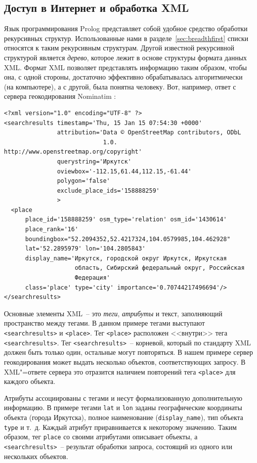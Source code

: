 \documentclass[a4paper,14pt, openany, twoside, final]{extbook} %
\begin{document}
\subsection{Доступ в Интернет и обработка XML}
\label{sec:inetxml}

Язык программирования Prolog представляет собой удобное средство обработки рекурсивных структур.  Использованные нами в разделе~\ref{sec:breadthfirst} списки относятся к таким рекурсивным структурам.  Другой известной рекурсивной структурой является \emph{дерево}, которое лежит в основе структуры формата данных XML.  Формат XML позволяет представлять информацию таким образом, чтобы она, с одной стороны, достаточно эффективно обрабатывалась алгоритмически (на компьютере), а с другой, была понятна человеку.  Вот, например, ответ с сервера геокодирования \foreignlanguage{latin}{Nominatim} \cite{nominatim}:

\begin{verbatim}
<?xml version="1.0" encoding="UTF-8" ?>
<searchresults timestamp='Thu, 15 Jan 15 07:54:30 +0000'
               attribution='Data © OpenStreetMap contributors, ODbL
                            1.0. http://www.openstreetmap.org/copyright'
               querystring='Иркутск'
               oviewbox='-112.15,61.44,112.15,-61.44'
               polygon='false'
               exclude_place_ids='158888259'
               >
  <place
      place_id='158888259' osm_type='relation' osm_id='1430614'
      place_rank='16'
      boundingbox="52.2094352,52.4217324,104.0579985,104.462928"
      lat='52.2895979' lon='104.2805843'
      display_name='Иркутск, городской округ Иркутск, Иркутская
                    область, Сибирский федеральный округ, Российская
                    Федерация'
      class='place' type='city' importance='0.70744217496694'/>
</searchresults>
\end{verbatim}


Основные элементы XML~-- это \emph{теги}, \emph{атрибуты} и текст, заполняющий пространство между тегами.  В данном примере тегами выступают \texttt{<searchresults>} и \texttt{<place>}.  Тег \texttt{<place>} расположен <<внутри>> тега \texttt{<searchresults>}.  Тег \texttt{<searchresults>}~-- корневой, который по стандарту XML должен быть только один, остальные могут повторяться.  В нашем примере сервер геокодирования может выдать несколько объектов, соответствующих запросу.  В XML"=ответе сервера это отразится наличием повторений тега \texttt{<place>} для каждого объекта.

Атрибуты ассоциированы с тегами и несут формализованную дополнительную информацию.  В примере тегами \texttt{lat} и \texttt{lon} заданы географические координаты объекта (города Иркутска), полное наименование (\texttt{display\_name}), тип объекта \texttt{type} и т.~д.  Каждый атрибут приравнивается к некоторому значению.  Таким образом, тег \texttt{place} со своими атрибутами описывает объекты, а \texttt{<searchresults>}~-- результат обработки запроса, состоящий из одного или нескольких объектов.
\end{document}
